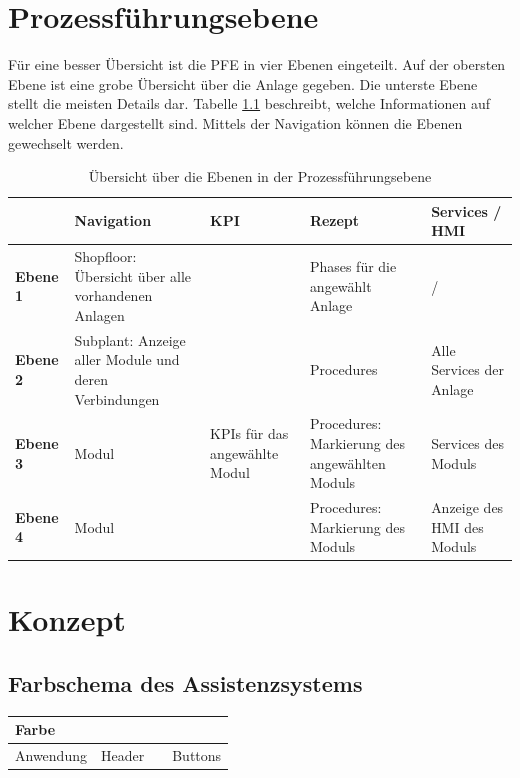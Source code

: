 \chapter{Prozessführungsebene}
\label{A:PFE}
Für eine besser Übersicht ist die PFE in vier Ebenen eingeteilt. Auf der obersten Ebene ist eine grobe Übersicht über die Anlage gegeben. Die unterste Ebene stellt die meisten Details dar. Tabelle \ref{tab:Ebenen-PFE} beschreibt, welche Informationen auf welcher Ebene dargestellt sind. Mittels der Navigation können die Ebenen gewechselt werden.
\begin{table}[htbp]
\caption{Übersicht über die Ebenen in der Prozessführungsebene}
\centering
\begin{tabular}{p{}|p{}|p{}|p{}|p{}|}
 & \textbf{Navigation} & \textbf{KPI} & \textbf{Rezept} & \textbf{Services / HMI} \\
\hline
\textbf{Ebene 1} & Shopfloor: Übersicht über alle vorhandenen Anlagen & & Phases für die angewählt Anlage & / \\
\hline
\textbf{Ebene 2} & Subplant: Anzeige aller Module und deren Verbindungen &  & Procedures & Alle Services der Anlage \\
\hline
\textbf{Ebene 3} & Modul & KPIs für das angewählte Modul & Procedures: Markierung des angewählten Moduls & Services des Moduls \\
\hline \textbf{Ebene 4} & Modul & & Procedures: Markierung des Moduls & Anzeige des HMI des Moduls \\
\hline
\end{tabular}
\label{tab:Ebenen-PFE}
\end{table}


\chapter{Konzept}
\section{Farbschema des Assistenzsystems}
\label{A:Farbschema-Assistenz}
\begin{table}[htb]
\begin{tabular}{l|l|l|l|}
Farbe & \cellcolor{darkgreen}{\color{white}689F38} & \cellcolor{green}{\color{white}689F38} &  \cellcolor{lightgreen}{689F38}\\
\hline
Anwendung & Header & & Buttons\\
\end{tabular}
\end{table}

